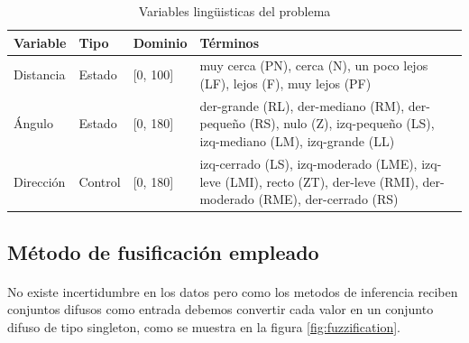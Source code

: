 \documentclass[a4paper,10pt]{article}
\begin{document}
\begin{table}[htb]%
	\begin{center}
		 \begin{tabular}{| l | l | l |p{3.5cm}|}
			  \hline
			    Variable & Tipo & Dominio & Términos \\ \hline
			    Distancia & Estado & [0, 100] & muy cerca (PN), \newline cerca (N), \newline un poco lejos (LF), \newline lejos (F), \newline muy lejos (PF) \\ \hline
			    Ángulo & Estado & [0, 180] & der-grande (RL), \newline der-mediano (RM), \newline der-pequeño (RS), \newline nulo (Z), \newline izq-pequeño (LS), \newline 					izq-mediano (LM), \newline izq-grande (LL) \\ \hline
			    Dirección & Control & [0, 180] & izq-cerrado (LS), \newline izq-moderado (LME), \newline izq-leve (LMI), \newline recto (ZT), \newline der-leve (RMI), \newline 				der-moderado (RME), \newline der-cerrado (RS) \\ \hline
		  \end{tabular}		  
		  \caption{Variables lingüisticas del problema  \label{tab:lv}}%
	\end{center}
\end{table}

\subsection{Método de fusificación empleado}\label{sub:fuzzification}
\paragraph{} No existe incertidumbre en los datos pero como los metodos de inferencia reciben conjuntos difusos como entrada debemos convertir cada valor
en un conjunto difuso de tipo singleton, como se muestra en la figura \ref{fig:fuzzification}.
\end{document}
